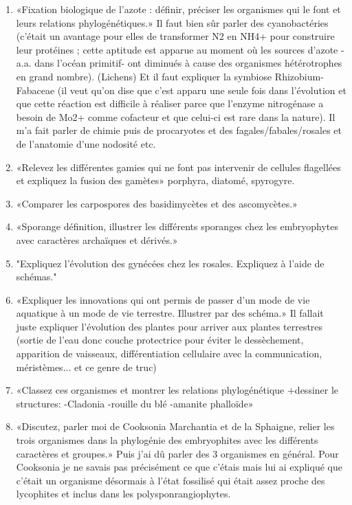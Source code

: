 \begin{enumerate}
	\item «Fixation biologique de l'azote : définir, préciser les organismes qui le font et leurs relations phylogénétiques.» Il faut bien sûr parler des cyanobactéries (c'était un avantage pour elles de transformer N2 en NH4+ pour construire leur protéines ; cette aptitude est apparue au moment où les sources d'azote -a.a. dans l'océan primitif- ont diminués à cause des organismes hétérotrophes en grand nombre). (Lichens) Et il faut expliquer la symbiose Rhizobium-Fabaceae (il veut qu'on dise que c'est apparu une seule fois dans l'évolution et que cette réaction est difficile à réaliser parce que l'enzyme nitrogénase a besoin de Mo2+ comme cofacteur et que celui-ci est rare dans la nature). Il m'a fait parler de chimie puis de procaryotes et des fagales/fabales/rosales et de l'anatomie d'une nodosité etc.

	\item «Relevez les différentes gamies qui ne font pas intervenir de cellules flagellées et expliquez la fusion des gamètes»  porphyra, diatomé, spyrogyre.

	\item «Comparer les carpospores des basidimycètes et des ascomycètes.»

	\item «Sporange définition, illustrer les différents sporanges chez les embryophytes avec caractères archaïques et dérivés.»

	\item "Expliquez l'évolution des gynécées chez les rosales. Expliquez à l'aide de schémas."
	
	\item «Expliquer les innovations qui ont permis de passer d'un mode de vie aquatique à un mode de vie terrestre. Illustrer par des schéma.» Il fallait juste expliquer l'évolution des plantes pour arriver aux plantes terrestres (sortie de l’eau donc couche protectrice pour éviter le dessèchement, apparition  de vaisseaux, différentiation cellulaire avec la communication, méristèmes... et ce genre de truc)

	\item «Classez ces organismes et montrer les relations phylogénétique +dessiner le structures:
-Cladonia
-rouille du blé
-amanite phalloïde»


	\item «Discutez, parler moi de Cooksonia Marchantia et de la Sphaigne, relier les trois organismes dans la phylogénie des embryophites avec les différents caractères et groupes.» Puis j’ai dû parler des 3 organismes en général. Pour Cooksonia je ne savais pas précisément ce que c'étais mais lui ai expliqué que c'était un organisme désormais à l'état fossilisé qui était assez proche des lycophites et inclus dans les polysponrangiophytes.


\end{enumerate}

